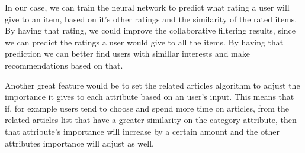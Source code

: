 In our case, we can train the neural network to predict what rating a user will give to an item, based on it's other ratings and the similarity of the rated items.
By having that rating, we could improve the collaborative filtering results, since we can predict the ratings a user would give to all the items. By having that prediction we can better find users with simillar interests and make recommendations based on that.

Another great feature would be to set the related articles algorithm to adjust the importance it gives to each attribute based on an user's input. This means that if, for example users tend to choose and spend more time on articles, from the related articles list that have a greater similarity on the category attribute, then that attribute's importance will increase by a certain amount and the other attributes importance will adjust as well.